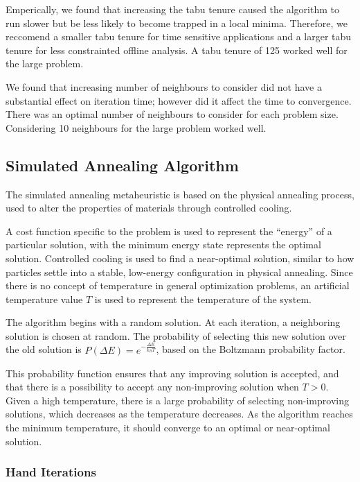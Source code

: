 \documentclass[a4paper]{article}
\begin{document}
Emperically, we found that increasing the tabu tenure caused the algorithm to run slower but be less likely to become trapped in a local minima. Therefore, we reccomend a smaller tabu tenure for time sensitive applications and a larger tabu tenure for less constrainted offline analysis. A tabu tenure of 125 worked well for the large problem.

We found that increasing number of neighbours to consider did not have a substantial effect on iteration time; however did it affect the time to convergence. There was an optimal number of neighbours to consider for each problem size. Considering 10 neighbours for the large problem worked well.

\subsection{Simulated Annealing Algorithm} %

The simulated annealing metaheuristic is based on the physical annealing process, used to alter the properties of materials through controlled cooling.\cite{Kirkpatrick}

A cost function specific to the problem is used to represent the ``energy'' of a particular solution, with the minimum energy state represents the optimal solution.
Controlled cooling is used to find a near-optimal solution, similar to how particles settle into a stable, low-energy configuration in physical annealing.
Since there is no concept of temperature in general optimization problems, an artificial temperature value $T$ is used to represent the temperature of the system.

The algorithm begins with a random solution. At each iteration, a neighboring solution is chosen at random. The probability of selecting this new solution over the old solution is $\mathit{P}(\Delta{}E) = e^{-\frac{\Delta{}E}{k_{B}T}}$, based on the Boltzmann probability factor.\cite{Kirkpatrick}

This probability function ensures that any improving solution is accepted, and that there is a possibility to accept any non-improving solution when $T>0$. Given a high temperature, there is a large probability of selecting non-improving solutions, which decreases as the temperature decreases. As the algorithm reaches the minimum temperature, it should converge to an optimal or near-optimal solution.

\subsubsection{Hand Iterations}
\end{document}
